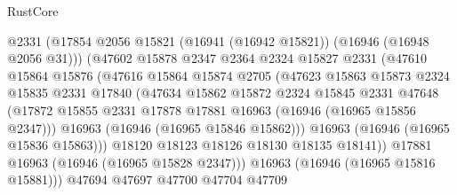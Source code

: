 \begin{lexlean}{RustCore}
\begin{coremodule}
                            @2331
                            (@17854
                              @2056
                              @15821
                              (@16941 (@16942 @15821))
                              (@16946 (@16948 @2056 @31)))
                            (@47602
                              @15878
                              @2347
                              @2364
                              @2324
                              @15827
                              @2331
                              (@47610
                                @15864
                                @15876
                                (@47616
                                  @15864
                                  @15874
                                  @2705
                                  (@47623
                                    @15863
                                    @15873
                                    @2324
                                    @15835
                                    @2331
                                    @17840
                                    (@47634
                                      @15862
                                      @15872
                                      @2324
                                      @15845
                                      @2331
                                      @47648
                                      (@17872
                                        @15855
                                        @2331
                                        @17878
                                        @17881
                                        @16963
                                        (@16946 (@16965 @15856 @2347)))
                                      @16963
                                      (@16946 (@16965 @15846 @15862)))
                                    @16963
                                    (@16946 (@16965 @15836 @15863)))
                                  @18120
                                  @18123
                                  @18126
                                  @18130
                                  @18135
                                  @18141))
                              @17881
                              @16963
                              (@16946 (@16965 @15828 @2347)))
                            @16963
                            (@16946 (@16965 @15816 @15881)))
                          @47694
                          @47697
                          @47700
                          @47704
                          @47709

\end{coremodule}
\end{lexlean}
